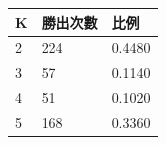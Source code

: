 \begin{tabular}{lll}
\hline
K & 勝出次數 & 比例 \\
\hline
2 & 224 & 0.4480 \\
3 & 57 & 0.1140 \\
4 & 51 & 0.1020 \\
5 & 168 & 0.3360 \\
\hline
\end{tabular}